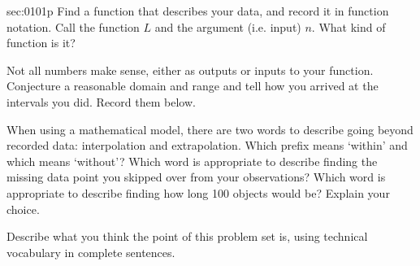 \begin{multicols*}{2}
\begin{exercises}{sec:0101p}
\lab[0101LabFunction] Find a \gls{function} that describes your data, and record it in \gls{function notation}.
Call the function $L$ and the argument (i.e. input) $n$.  What kind of function is it?

\vspace{3cm}
\lab[0101LabDR] Not all numbers make sense, either as outputs or inputs to your function.  Conjecture
a reasonable \gls{domain} and \gls{range} and tell how you arrived at the intervals you did.
Record them below.

\vspace{3cm}
\lab[0101LabExtra] When using a \gls{mathematical model}, there are two words to describe going beyond
recorded data:  \gls{interpolation} and \gls{extrapolation}.  
Which prefix means `within' and which means
`without'?  Which word is appropriate to describe finding the missing data point you skipped over from
your observations?  Which word is appropriate to describe finding how long 100 objects 
would be?  Explain your choice.

\vspace{4cm}
\lab[0101LabPoint] Describe what you think the point of this problem set is, using technical vocabulary in complete
sentences.
\end{exercises}
\end{multicols*}